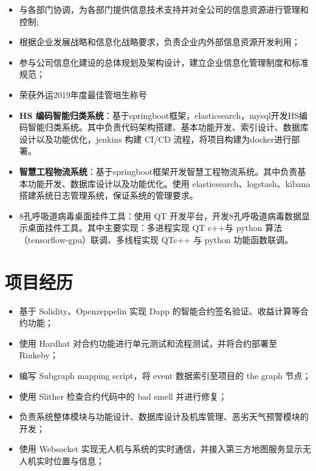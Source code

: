 \documentclass{resume}
\begin{document}
\begin{itemize}[parsep=0.5ex]
  \item 与各部门协调，为各部门提供信息技术支持并对全公司的信息资源进行管理和控制;
  \item 根据企业发展战略和信息化战略要求，负责企业内外部信息资源开发利用；
  \item 参与公司信息化建设的总体规划及架构设计，建立企业信息化管理制度和标准规范；
\end{itemize}

\begin{itemize}[parsep=0.5ex]
  \item 荣获外运2019年度最佳管培生称号
  \item \textbf{HS 编码智能归类系统}：基于springboot框架，elasticsearch，mysql开发HS编码智能归类系统。其中负责代码架构搭建、基本功能开发、索引设计、数据库设计以及功能优化，jenkins 构建 CI/CD 流程，将项目构建为docker进行部署。
  \item \textbf{智慧工程物流系统}：基于springboot框架开发智慧工程物流系统。其中负责基本功能开发、数据库设计以及功能优化。使用 elasticsearch、logstash、kibana 搭建系统日志管理系统，保证系统的管理要求。
\end{itemize}

\begin{itemize}[parsep=0.5ex]
  \item 8孔呼吸道病毒桌面挂件工具：使用 QT 开发平台，开发8孔呼吸道病毒数据显示桌面挂件工具。其中主要实现：多进程实现 QT c++与 python 算法（tensorflow-gpu）联调、多线程实现 QTc++ 与 python 功能函数联调。
\end{itemize}

\section{项目经历}
\begin{itemize}[parsep=0.5ex]
  \item 基于 Solidity、Openzeppelin 实现 Dapp 的智能合约签名验证、收益计算等合约功能；
  \item 使用 Hardhat 对合约功能进行单元测试和流程测试，并将合约部署至 Rinkeby；
  \item 编写 Subgraph mapping script，将 event 数据索引至项目的 the graph 节点；
  \item 使用 Slither 检查合约代码中的 bad smell 并进行修复；
\end{itemize}
\begin{itemize}[parsep=0.5ex]
  \item 负责系统整体模块与功能设计、数据库设计及机库管理、恶劣天气预警模块的开发；
  \item 使用 Websocket 实现无人机与系统的实时通信，并接入第三方地图服务显示无人机实时位置与信息；
\end{itemize}
\end{document}
